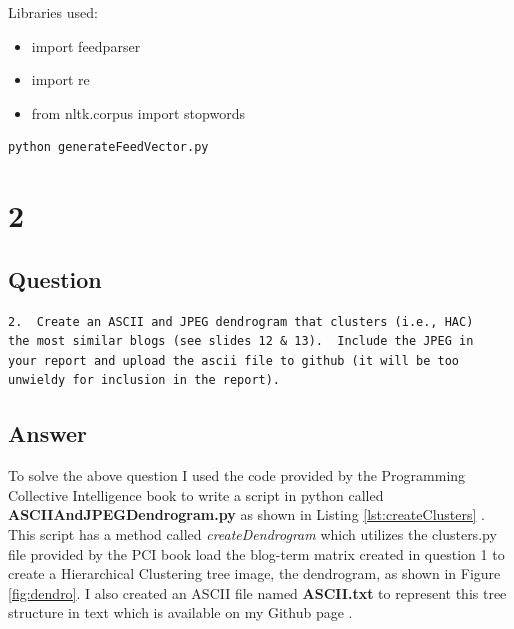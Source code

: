 \documentclass[letterpaper,11pt]{article}
\begin{document}
Libraries used:

\begin{itemize}
\item import feedparser
\item import re
\item from nltk.corpus import stopwords

\end{itemize}
\begin{lstlisting}[frame=single]
python generateFeedVector.py
\end{lstlisting}

 


\clearpage


\section*{2}

\subsection*{Question}

\begin{verbatim}
2.  Create an ASCII and JPEG dendrogram that clusters (i.e., HAC)
the most similar blogs (see slides 12 & 13).  Include the JPEG in
your report and upload the ascii file to github (it will be too
unwieldy for inclusion in the report).
\end{verbatim}

\subsection*{Answer}

To solve the above question I used the code provided by the Programming Collective Intelligence book to write a script in python  called \textbf{ASCIIAndJPEGDendrogram.py} as shown in Listing \ref{lst:createClusters} \cite{collectiveIntell}. This script has a method called \textit{createDendrogram} which utilizes the clusters.py file provided by the PCI book load the blog-term matrix created in question 1 to create a Hierarchical Clustering tree image, the dendrogram, as shown in Figure \ref{fig:dendro}. I also created an ASCII file named \textbf{ASCII.txt} to represent this tree structure in text which is available on my Github page \cite{github}.
\end{document}
